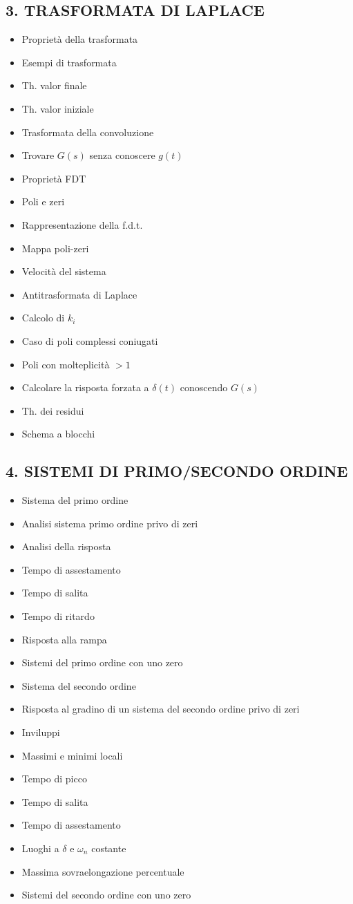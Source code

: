 \documentclass[11pt,a4paper]{article}
\begin{document}
\subsection*{3. TRASFORMATA DI LAPLACE}
\begin{itemize}
\item Proprietà della trasformata
\item Esempi di trasformata
\item Th. valor finale
\item Th. valor iniziale
\item Trasformata della convoluzione
\item Trovare $G(s)$ senza conoscere $g(t)$
\item Proprietà FDT
\item Poli e zeri
\item Rappresentazione della f.d.t.
\item Mappa poli-zeri
\item Velocità del sistema
\item Antitrasformata di Laplace
\item Calcolo di $k_i$
\item Caso di poli complessi coniugati
\item Poli con molteplicità $>1$
\item Calcolare la risposta forzata a $\delta(t)$ conoscendo $G(s)$
\item Th. dei residui
\item Schema a blocchi
\end{itemize}
\subsection*{4. SISTEMI DI PRIMO/SECONDO ORDINE}
\begin{itemize}
\item Sistema del primo ordine
\item Analisi sistema primo ordine privo di zeri
\item Analisi della risposta
\item Tempo di assestamento
\item Tempo di salita
\item Tempo di ritardo
\item Risposta alla rampa
\item Sistemi del primo ordine con uno zero
\item Sistema del secondo ordine
\item Risposta al gradino di un sistema del secondo ordine privo di zeri
\item Inviluppi
\item Massimi e minimi locali
\item Tempo di picco
\item Tempo di salita
\item Tempo di assestamento
\item Luoghi a $\delta$ e $\omega_n$ costante
\item Massima sovraelongazione percentuale
\item Sistemi del secondo ordine con uno zero
\end{itemize}
\end{document}
